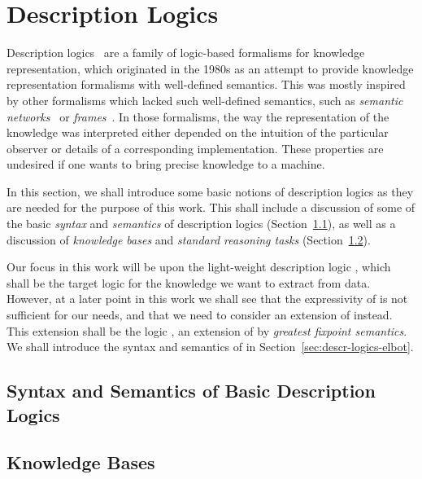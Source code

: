 \chapter{Description Logics}
\label{cha:description-logics}

Description logics~\cite{DLhandbook} are a family of logic-based formalisms for knowledge
representation, which originated in the 1980s as an attempt to provide knowledge
representation formalisms with well-defined semantics.  This was mostly inspired by other
formalisms which lacked such well-defined semantics, such as \emph{semantic
  networks}~\cite{SemanticNetworks} or \emph{frames}~\cite{Minsky-Frames}.  In those
formalisms, the way the representation of the knowledge was interpreted either depended on
the intuition of the particular observer or details of a corresponding implementation.
These properties are undesired if one wants to bring precise knowledge to a machine.

In this section, we shall introduce some basic notions of description logics as they are
needed for the purpose of this work.  This shall include a discussion of some of the basic
\emph{syntax} and \emph{semantics} of description logics
(Section~\ref{sec:basic-noti-descr}), as well as a discussion of \emph{knowledge bases}
and \emph{standard reasoning tasks} (Section~\ref{sec:knowledge-bases}).

Our focus in this work will be upon the light-weight description logic \ELbot, which shall
be the target logic for the knowledge we want to extract from data.  However, at a later
point in this work we shall see that the expressivity of \ELbot is not sufficient for our
needs, and that we need to consider an extension of \ELbot instead.  This extension shall
be the logic \ELgfpbot, an extension of \ELbot by \emph{greatest fixpoint semantics}.  We
shall introduce the syntax and semantics of \ELgfpbot in
Section~\ref{sec:descr-logics-elbot}.

\section{Syntax and Semantics of Basic Description Logics}
\label{sec:basic-noti-descr}

%
%
%

\section{Knowledge Bases}
\label{sec:knowledge-bases}

